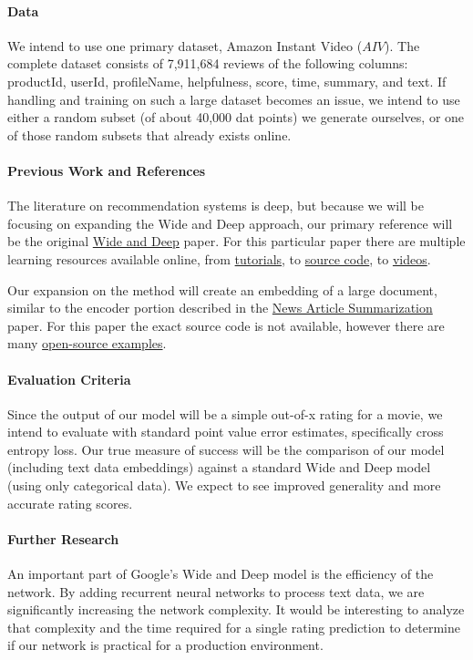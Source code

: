 \documentclass[preprint,10.5pt]{article}
\begin{document}
\paragraph{Data} We intend to use one primary dataset, Amazon Instant Video ($AIV$). The complete dataset consists of 7,911,684 reviews of the following columns: productId, userId, profileName, helpfulness, score, time, summary, and text. If handling and training on such a large dataset becomes an issue, we intend to use either a random subset (of about 40,000 dat points) we generate ourselves, or one of those random subsets that already exists online.

\paragraph{Previous Work and References} The literature on recommendation systems is deep, but because we will be focusing on expanding the Wide and Deep approach, our primary reference will be the original \href{https://www.tensorflow.org/tutorials/wide_and_deep}{Wide and Deep} paper. For this particular paper there are multiple learning resources available online, from \href{https://www.tensorflow.org/tutorials/wide_and_deep}{tutorials}, to \href{https://github.com/tensorflow/tensorflow/blob/master/tensorflow/examples/learn/wide_n_deep_tutorial.py}{source code}, to \href{https://www.youtube.com/watch?v=NV1tkZ9Lq48}{videos}.
\par Our expansion on the method will create an embedding of a large document, similar to the encoder portion described in the \href{https://web.stanford.edu/class/cs224n/reports/2746634.pdf}{News Article Summarization} paper. For this paper the exact source code is not available, however there are many \href{https://github.com/hengluchang/deep-news-summarization}{open-source examples}.

\paragraph{Evaluation Criteria} Since the output of our model will be a simple out-of-x rating for a movie, we intend to evaluate with standard point value error estimates, specifically cross entropy loss. Our true measure of success will be the comparison of our model (including text data embeddings) against a standard Wide and Deep model (using only categorical data). We expect to see improved generality and more accurate rating scores.

\paragraph{Further Research} An important part of Google's Wide and Deep model is the efficiency of the network. By adding recurrent neural networks to process text data, we are significantly increasing the network complexity. It would be interesting to analyze that complexity and the time required for a single rating prediction to determine if our network is practical for a production environment.
\end{document}
